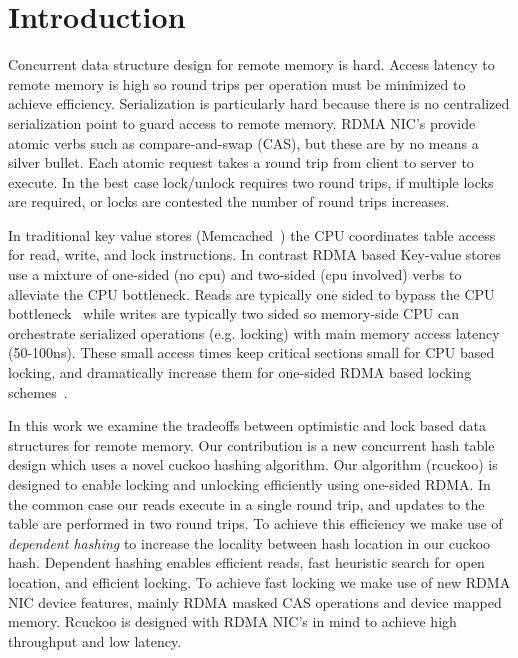 \section{Introduction}
\label{sec:intro}

Concurrent data structure design for remote memory is hard.
Access latency to remote memory is high so round trips per
operation must be minimized to achieve efficiency.
Serialization is particularly hard because there is no
centralized serialization point to guard access to remote
memory. RDMA NIC's provide atomic verbs such as
compare-and-swap (CAS), but these are by no means a silver
bullet.  Each atomic request takes a round trip from client
to server to execute. In the best case lock/unlock requires
two round trips, if multiple locks are required, or locks
are contested the number of round trips increases.

In traditional key value stores (Memcached~\cite{memcached})
the CPU coordinates table access for read, write, and lock
instructions. In contrast RDMA based Key-value
stores~\cite{herd,erpc,pilaf} use a mixture of one-sided (no
cpu) and two-sided (cpu involved) verbs to alleviate the CPU
bottleneck. Reads are typically one sided to bypass the CPU
bottleneck~\cite{pilaf,cell} while writes are typically two
sided so memory-side CPU can orchestrate serialized
operations (e.g. locking) with main memory access latency
(50-100ns).  These small access times keep critical sections
small for CPU based locking, and dramatically increase them
for one-sided RDMA based locking schemes~\cite{clover,
sherman}.

In this work we examine the tradeoffs between optimistic and
lock based data structures for remote memory. Our
contribution is a new concurrent hash table design which
uses a novel cuckoo hashing algorithm. Our algorithm
(rcuckoo) is designed to enable locking and unlocking
efficiently using one-sided RDMA. In the common case our
reads execute in a single round trip, and updates to the
table are performed in two round trips. To achieve this
efficiency we make use of \textit{dependent hashing} to
increase the locality between hash location in our cuckoo
hash. Dependent hashing enables efficient reads, fast
heuristic search for open location, and efficient locking.
To achieve fast locking we make use of new RDMA NIC device
features, mainly RDMA masked CAS operations and device
mapped memory. Rcuckoo is designed with RDMA NIC's in mind
to achieve high throughput and low latency.

